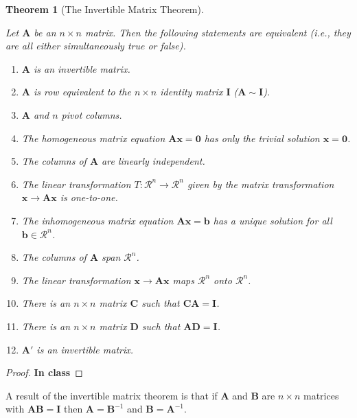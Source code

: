 \documentclass[
]{book}
\newtheorem{theorem}{Theorem}[chapter]
\theoremstyle{definition}
\theoremstyle{definition}
\theoremstyle{definition}
\theoremstyle{definition}
\theoremstyle{remark}
\begin{document}
\begin{theorem}[The Invertible Matrix Theorem]
\protect\hypertarget{thm:invertible-matrix}{}\label{thm:invertible-matrix}

Let \(\mathbf{A}\) be an \(n \times n\) matrix. Then the following statements are equivalent (i.e., they are all either simultaneously true or false).

\begin{enumerate}
\def\labelenumi{\arabic{enumi})}
\item
  \(\mathbf{A}\) is an invertible matrix.
\item
  \(\mathbf{A}\) is row equivalent to the \(n \times n\) identity matrix \(\mathbf{I}\) (\(\mathbf{A} \sim \mathbf{I}\)).
\item
  \(\mathbf{A}\) and \(n\) pivot columns.
\item
  The homogeneous matrix equation \(\mathbf{A} \mathbf{x} = \mathbf{0}\) has only the trivial solution \(\mathbf{x} = \mathbf{0}\).
\item
  The columns of \(\mathbf{A}\) are linearly independent.
\item
  The linear transformation \(T:\mathcal{R}^n \rightarrow \mathcal{R}^n\) given by the matrix transformation \(\mathbf{x} \rightarrow \mathbf{A}\mathbf{x}\) is one-to-one.
\item
  The inhomogeneous matrix equation \(\mathbf{A} \mathbf{x} = \mathbf{b}\) has a unique solution for all \(\mathbf{b} \in \mathcal{R}^n\).
\item
  The columns of \(\mathbf{A}\) span \(\mathcal{R}^n\).
\item
  The linear transformation \(\mathbf{x} \rightarrow \mathbf{A} \mathbf{x}\) maps \(\mathcal{R}^n\) onto \(\mathcal{R}^n\).
\item
  There is an \(n \times n\) matrix \(\mathbf{C}\) such that \(\mathbf{C}\mathbf{A} = \mathbf{I}\).
\item
  There is an \(n \times n\) matrix \(\mathbf{D}\) such that \(\mathbf{A}\mathbf{D} = \mathbf{I}\).
\item
  \(\mathbf{A}'\) is an invertible matrix.
\end{enumerate}

\end{theorem}

\begin{proof}
\textbf{In class}
\end{proof}

A result of the invertible matrix theorem is that if \(\mathbf{A}\) and \(\mathbf{B}\) are \(n \times n\) matrices with \(\mathbf{A} \mathbf{B} = \mathbf{I}\) then \(\mathbf{A} = \mathbf{B}^{-1}\) and \(\mathbf{B} = \mathbf{A}^{-1}\).
\end{document}
